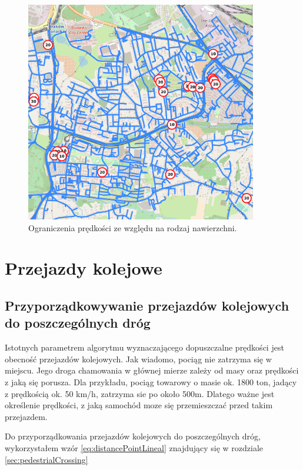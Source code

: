 \newpage
\begin{figure}[h]
\caption{Ograniczenia prędkości ze względu na rodzaj nawierzchni.}
\label{sec:surfaceTypePhoto}
\centering
\includegraphics[width=0.9\textwidth]{surfaceType}
\end{figure}

\newpage
\section{Przejazdy kolejowe}
\subsection{Przyporządkowywanie przejazdów kolejowych do poszczególnych dróg}

Istotnych parametrem algorytmu wyznaczającego dopuszczalne prędkości jest obecność przejazdów kolejowych. Jak wiadomo, pociąg nie zatrzyma się w miejscu. Jego droga chamowania w głównej mierze zależy od masy oraz prędkości z jaką się porusza. Dla przykładu, pociąg towarowy o masie ok. 1800 ton, jadący z prędkością ok. 50 km/h, zatrzyma sie po około 500m. Dlatego ważne jest określenie prędkości, z jaką samochód moze się przemieszczać przed takim przejazdem.

Do przyporządkowania przejazdów kolejowych do poszczególnych dróg, wykorzystałem wzór \ref{eq:distancePointLineal} znajdujący się w rozdziale \ref{sec:pedestrialCrossing}


